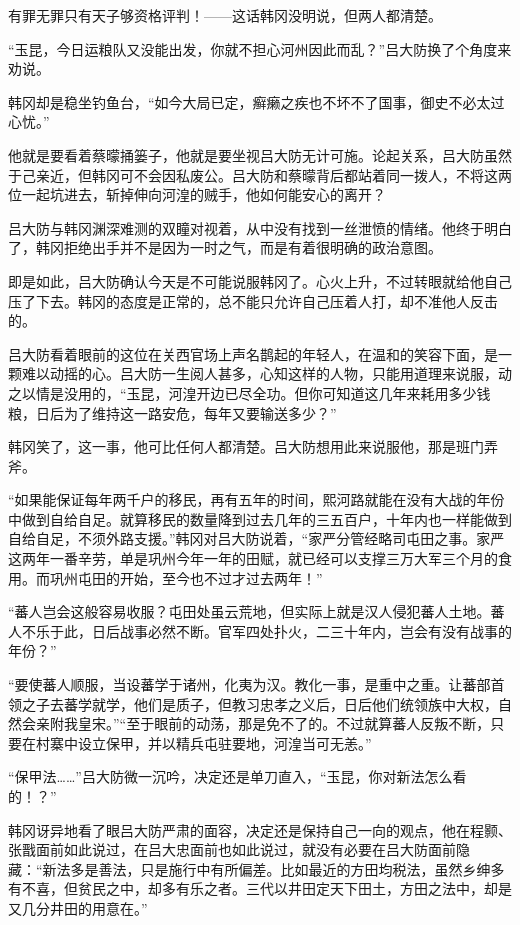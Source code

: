 有罪无罪只有天子够资格评判！——这话韩冈没明说，但两人都清楚。

“玉昆，今日运粮队又没能出发，你就不担心河州因此而乱？”吕大防换了个角度来劝说。

韩冈却是稳坐钓鱼台，“如今大局已定，癣癞之疾也不坏不了国事，御史不必太过心忧。”

他就是要看着蔡曚捅篓子，他就是要坐视吕大防无计可施。论起关系，吕大防虽然于己亲近，但韩冈可不会因私废公。吕大防和蔡曚背后都站着同一拨人，不将这两位一起坑进去，斩掉伸向河湟的贼手，他如何能安心的离开？

吕大防与韩冈渊深难测的双瞳对视着，从中没有找到一丝泄愤的情绪。他终于明白了，韩冈拒绝出手并不是因为一时之气，而是有着很明确的政治意图。

即是如此，吕大防确认今天是不可能说服韩冈了。心火上升，不过转眼就给他自己压了下去。韩冈的态度是正常的，总不能只允许自己压着人打，却不准他人反击的。

吕大防看着眼前的这位在关西官场上声名鹊起的年轻人，在温和的笑容下面，是一颗难以动摇的心。吕大防一生阅人甚多，心知这样的人物，只能用道理来说服，动之以情是没用的，“玉昆，河湟开边已尽全功。但你可知道这几年来耗用多少钱粮，日后为了维持这一路安危，每年又要输送多少？”

韩冈笑了，这一事，他可比任何人都清楚。吕大防想用此来说服他，那是班门弄斧。

“如果能保证每年两千户的移民，再有五年的时间，熙河路就能在没有大战的年份中做到自给自足。就算移民的数量降到过去几年的三五百户，十年内也一样能做到自给自足，不须外路支援。”韩冈对吕大防说着，“家严分管经略司屯田之事。家严这两年一番辛劳，单是巩州今年一年的田赋，就已经可以支撑三万大军三个月的食用。而巩州屯田的开始，至今也不过才过去两年！”

“蕃人岂会这般容易收服？屯田处虽云荒地，但实际上就是汉人侵犯蕃人土地。蕃人不乐于此，日后战事必然不断。官军四处扑火，二三十年内，岂会有没有战事的年份？”

“要使蕃人顺服，当设蕃学于诸州，化夷为汉。教化一事，是重中之重。让蕃部首领之子去蕃学就学，他们是质子，但教习忠孝之义后，日后他们统领族中大权，自然会亲附我皇宋。”“至于眼前的动荡，那是免不了的。不过就算蕃人反叛不断，只要在村寨中设立保甲，并以精兵屯驻要地，河湟当可无恙。”

“保甲法……”吕大防微一沉吟，决定还是单刀直入，“玉昆，你对新法怎么看的！？”

韩冈讶异地看了眼吕大防严肃的面容，决定还是保持自己一向的观点，他在程颢、张戬面前如此说过，在吕大忠面前也如此说过，就没有必要在吕大防面前隐藏：“新法多是善法，只是施行中有所偏差。比如最近的方田均税法，虽然乡绅多有不喜，但贫民之中，却多有乐之者。三代以井田定天下田土，方田之法中，却是又几分井田的用意在。”

